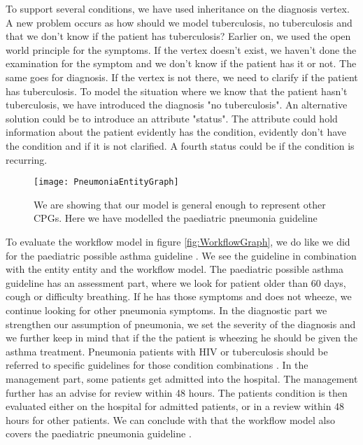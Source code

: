 \documentclass[a4paper,12pt]{book}
\begin{document}
To support several conditions, we have used inheritance on the diagnosis vertex. A new problem occurs as how should we model tuberculosis, no tuberculosis and that we don't know if the patient has tuberculosis? Earlier on, we used the open world principle for the symptoms. If the vertex doesn't exist, we haven't done the examination for the symptom and we don't know if the patient has it or not. The same goes for diagnosis. If the vertex is not there, we need to clarify if the patient has tuberculosis. To model the situation where we know that the patient hasn't tuberculosis, we have introduced the diagnosis "no tuberculosis". An alternative solution could be to introduce an attribute "status". The attribute could hold information about the patient evidently has the condition, evidently don't have the condition and if it is not clarified. A fourth status could be if the condition is recurring.

\begin{figure}[h!]
	\caption {We are showing that our model is general enough to represent other CPGs. Here we have modelled the paediatric pneumonia guideline \parencite{RepublicofKeny2016}}
	\label{fig:PneumoniaEntityGraph}
	\texttt{[image: PneumoniaEntityGraph]}
\end{figure}

To evaluate the workflow model in figure \ref{fig:WorkflowGraph}, we do like we did for the paediatric possible asthma guideline \parencite{RepublicofKeny2016}. We see the guideline in combination with the entity entity and the workflow model. The paediatric possible asthma guideline \parencite{RepublicofKeny2016} has an assessment part, where we look for patient older than 60 days, cough or difficulty breathing. If he has those symptoms and does not wheeze, we continue looking for other pneumonia symptoms. In the diagnostic part we strengthen our assumption of pneumonia, we set the severity of the diagnosis and we further keep in mind that if the the patient is wheezing he should be given the asthma treatment. Pneumonia patients with HIV or tuberculosis should be referred to specific guidelines for those condition combinations \parencite{RepublicofKeny2016}. In the management part, some patients get admitted into the hospital. The management further has an advise for review within 48 hours. The patients condition is then evaluated either on the hospital for admitted patients, or in a review within 48 hours for other patients. We can conclude with that the workflow model  also covers the paediatric pneumonia guideline \parencite{RepublicofKeny2016}.
\end{document}

